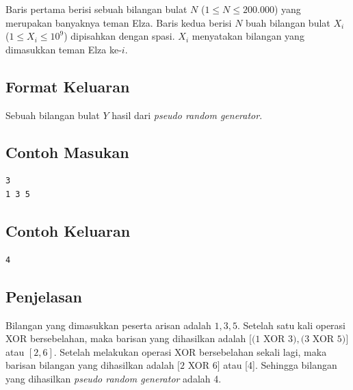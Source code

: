 \documentclass{article}
\begin{document}
Baris pertama berisi sebuah bilangan bulat $N$ ($1 \leq N \leq 200.000$) yang merupakan banyaknya teman Elza.
Baris kedua berisi $N$ buah bilangan bulat $X_i$ ($1 \leq X_i \leq 10^{9}$) dipisahkan dengan spasi. $X_i$ menyatakan bilangan yang dimasukkan teman Elza ke-$i$.

\subsection*{Format Keluaran}

Sebuah bilangan bulat $Y$ hasil dari  \textit{pseudo random generator}.
\\

\begin{multicols}{2}
\subsection*{Contoh Masukan}
\begin{lstlisting}
3
1 3 5
\end{lstlisting}
\columnbreak
\subsection*{Contoh Keluaran}
\begin{lstlisting}
4
\end{lstlisting}
\vfill
\null
\end{multicols}

\subsection*{Penjelasan}
Bilangan yang dimasukkan peserta arisan adalah $1, 3, 5$. 
Setelah satu kali operasi XOR bersebelahan, maka barisan yang dihasilkan adalah $[(1$ XOR $3), (3$ XOR $5)]$ atau  $[2, 6]$. Setelah melakukan operasi XOR bersebelahan sekali lagi, maka barisan bilangan yang dihasilkan adalah $[2$ XOR $6]$ atau [4]. Sehingga bilangan yang dihasilkan \textit{pseudo random generator} adalah 4.


\pagebreak
\end{document}

